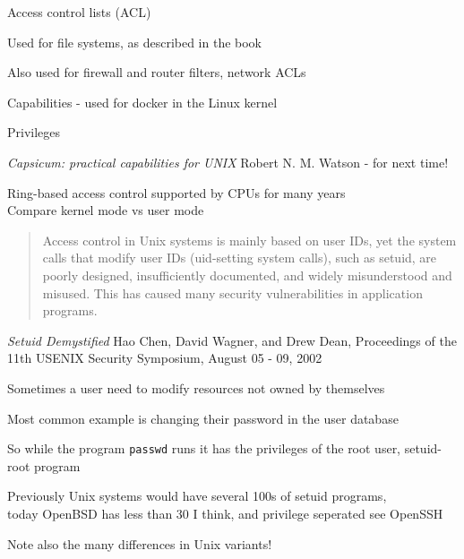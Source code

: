 \documentclass[Screen16to9,17pt]{foils}
\begin{document}
\begin{list1}
\item Access control lists (ACL)
\item Used for file systems, as described in the book
\item Also used for firewall and router filters, network ACLs
\item Capabilities - used for docker in the Linux kernel
\item Privileges
\item \emph{Capsicum: practical capabilities for UNIX} Robert N. M. Watson - for next time!
\item Ring-based access control supported by CPUs for many years\\
Compare kernel mode vs user mode
\end{list1}





\begin{quote}
Access control in Unix systems is mainly based on user
IDs, yet the system calls that modify user IDs (uid-setting
system calls), such as setuid, are poorly designed, insufficiently documented, and widely misunderstood and
misused. This has caused many security vulnerabilities
in application programs.
\end{quote}

\emph{Setuid Demystified} Hao Chen, David Wagner, and Drew Dean,
Proceedings of the 11th USENIX Security Symposium,
August 05 - 09, 2002


\begin{list2}
\item Sometimes a user need to modify resources not owned by themselves
\item Most common example is changing their password in the user database
\item So while the program \verb+passwd+ runs it has the privileges of the root user, setuid-root program
\item Previously Unix systems would have several 100s of setuid programs, \\
today OpenBSD has less than 30 I think, and privilege seperated see OpenSSH
\item Note also the many differences in Unix variants!
\end{list2}

\end{document}

